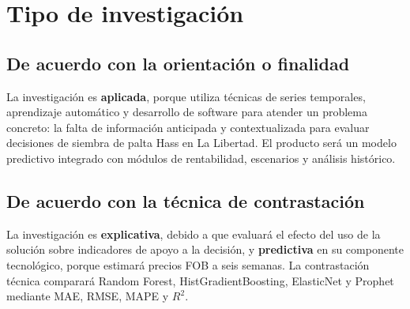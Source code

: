 \section{Tipo de investigación}

\subsection{De acuerdo con la orientación o finalidad}

La investigación es \textbf{aplicada}, porque utiliza técnicas de series temporales, aprendizaje automático y desarrollo de software para atender un problema concreto: la falta de información anticipada y contextualizada para evaluar decisiones de siembra de palta Hass en La Libertad. El producto será un modelo predictivo integrado con módulos de rentabilidad, escenarios y análisis histórico.

\subsection{De acuerdo con la técnica de contrastación}

La investigación es \textbf{explicativa}, debido a que evaluará el efecto del uso de la solución sobre indicadores de apoyo a la decisión, y \textbf{predictiva} en su componente tecnológico, porque estimará precios FOB a seis semanas. La contrastación técnica comparará Random Forest, HistGradientBoosting, ElasticNet y Prophet mediante MAE, RMSE, MAPE y $R^2$.

